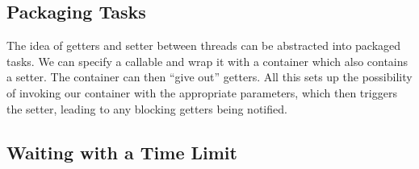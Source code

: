 \documentclass[10pt]{article}
\theoremstyle{break}
\begin{document}
\subsection{Packaging Tasks}
The idea of getters and setter between threads can be abstracted into packaged tasks.
We can specify a callable and wrap it with a container which also contains a setter.
The container can then ``give out'' getters.
All this sets up the possibility of invoking our container with the appropriate parameters, which then triggers the setter, leading to any blocking getters being notified.

\subsection{Waiting with a Time Limit}
\end{document}
